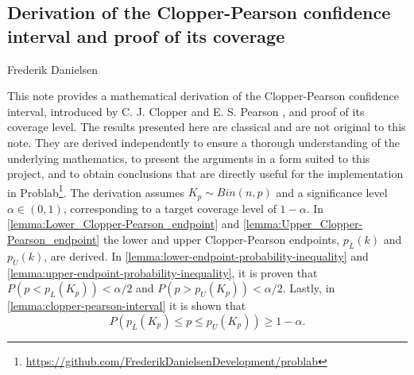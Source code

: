 \documentclass{article}
\begin{document}
\begin{center}
\section*{Derivation of the Clopper-Pearson confidence interval and proof of its coverage}
{\small Frederik Danielsen}
\end{center}

\vspace{1em}

\noindent This note provides a mathematical derivation of the Clopper-Pearson confidence interval, introduced by C. J. Clopper and E. S. Pearson \cite{clopper1934}, and proof of its coverage level. The results presented here are classical and are not original to this note. They are derived independently to ensure a thorough understanding of the underlying mathematics, to present the arguments in a form suited to this project, and to obtain conclusions that are directly useful for the implementation in Problab\footnote{\url{https://github.com/FrederikDanielsenDevelopment/problab}}. The derivation assumes $K_p\sim Bin(n,p)$ and a significance level $\alpha\in(0,1)$, corresponding to a target coverage level of $1-\alpha$. In \autoref{lemma:Lower_Clopper-Pearson_endpoint} and \autoref{lemma:Upper_Clopper-Pearson_endpoint} the lower and upper Clopper-Pearson endpoints, $p_L(k)$ and $p_U(k)$, are derived. In \autoref{lemma:lower-endpoint-probability-inequality} and \autoref{lemma:upper-endpoint-probability-inequality}, it is proven that $P(p<p_L(K_p))<\alpha/2$ and $P(p>p_U(K_p))<\alpha/2$. Lastly, in \autoref{lemma:clopper-pearson-interval} it is shown that 
$$P(p_L(K_p)\leq p \leq p_U(K_p)) \geq 1 - \alpha.$$
\end{document}
